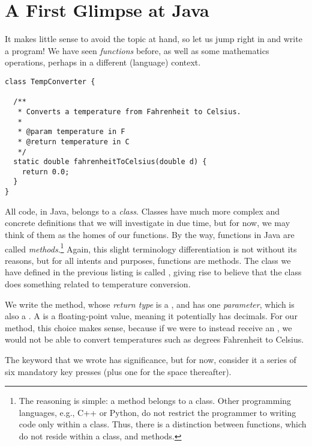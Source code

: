 \section{A First Glimpse at Java}
It makes little sense to avoid the topic at hand, so let us jump right in and write a program! We have seen \textit{functions} before, as well as some mathematics operations, perhaps in a different (language) context. 


\begin{cl}{}
\begin{lstlisting}[language=MyJava]
class TempConverter {
  
  /**
   * Converts a temperature from Fahrenheit to Celsius.
   * 
   * @param temperature in F
   * @return temperature in C
   */
  static double fahrenheitToCelsius(double d) {
    return 0.0;
  }
}
\end{lstlisting}
\end{cl}

All code, in Java, belongs to a \textit{class}. Classes have much more complex and concrete definitions that we will investigate in due time, but for now, we may think of them as the homes of our functions. By the way, functions in Java are called \textit{methods}.\footnote{The reasoning is simple: a method belongs to a class. Other programming languages, e.g., C++ or Python, do not restrict the programmer to writing code only within a class. Thus, there is a distinction between functions, which do not reside within a class, and methods.} Again, this slight terminology differentiation is not without its reasons, but for all intents and purposes, functions are methods. The class we have defined in the previous listing is called , giving rise to believe that the class does something related to temperature conversion.

We write the  method, whose \textit{return type} is a , and has one \textit{parameter}, which is also a . A  is a floating-point value, meaning it potentially has decimals. For our method, this choice makes sense, because if we were to instead receive an , we would not be able to convert temperatures such as  degrees Fahrenheit to Celsius. 

The  keyword that we wrote has significance, but for now, consider it a series of six mandatory key presses (plus one for the space thereafter).

